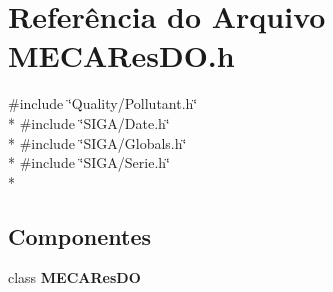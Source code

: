 \section{Referência do Arquivo M\+E\+C\+A\+Res\+D\+O.\+h}
\label{_m_e_c_a_res_d_o_8h}
{\ttfamily \#include \char`\"{}Quality/\+Pollutant.\+h\char`\"{}}\\*
{\ttfamily \#include \char`\"{}S\+I\+G\+A/\+Date.\+h\char`\"{}}\\*
{\ttfamily \#include \char`\"{}S\+I\+G\+A/\+Globals.\+h\char`\"{}}\\*
{\ttfamily \#include \char`\"{}S\+I\+G\+A/\+Serie.\+h\char`\"{}}\\*
\subsection*{Componentes}
\begin{DoxyCompactItemize}
\item 
class {\bf M\+E\+C\+A\+Res\+DO}
\end{DoxyCompactItemize}
